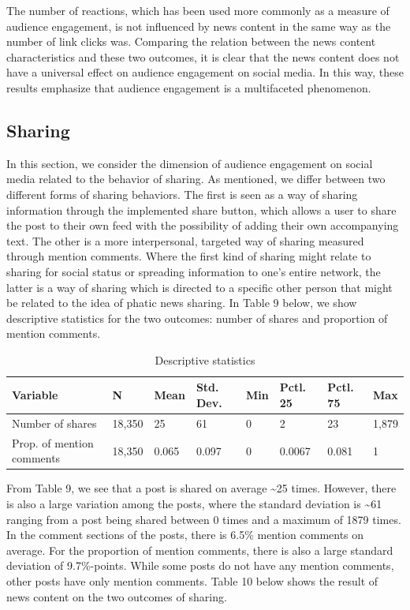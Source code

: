 \documentclass[
]{article}
\begin{document}
The number of reactions, which has been used more commonly as a measure
of audience engagement, is not influenced by news content in the same
way as the number of link clicks was. Comparing the relation between the
news content characteristics and these two outcomes, it is clear that
the news content does not have a universal effect on audience engagement
on social media. In this way, these results emphasize that audience
engagement is a multifaceted phenomenon.

\hypertarget{sharing-1}{%
\subsection{Sharing}\label{sharing-1}}

In this section, we consider the dimension of audience engagement on
social media related to the behavior of sharing. As mentioned, we differ
between two different forms of sharing behaviors. The first is seen as a
way of sharing information through the implemented share button, which
allows a user to share the post to their own feed with the possibility
of adding their own accompanying text. The other is a more
interpersonal, targeted way of sharing measured through mention
comments. Where the first kind of sharing might relate to sharing for
social status or spreading information to one's entire network, the
latter is a way of sharing which is directed to a specific other person
that might be related to the idea of phatic news sharing. In Table 9
below, we show descriptive statistics for the two outcomes: number of
shares and proportion of mention comments.

\begin{table}[H]

\caption{\label{tab:share_describe}Descriptive statistics}
\centering
\begin{tabular}[t]{llllllll}
\toprule
Variable & N & Mean & Std. Dev. & Min & Pctl. 25 & Pctl. 75 & Max\\
\midrule
Number of shares & 18,350 & 25 & 61 & 0 & 2 & 23 & 1,879\\
Prop. of mention comments & 18,350 & 0.065 & 0.097 & 0 & 0.0067 & 0.081 & 1\\
\bottomrule
\end{tabular}
\end{table}

\noindent From Table 9, we see that a post is shared on average
\textasciitilde25 times. However, there is also a large variation among
the posts, where the standard deviation is \textasciitilde61 ranging
from a post being shared between 0 times and a maximum of 1879 times. In
the comment sections of the posts, there is 6.5\% mention comments on
average. For the proportion of mention comments, there is also a large
standard deviation of 9.7\%-points. While some posts do not have any
mention comments, other posts have only mention comments. Table 10 below
shows the result of news content on the two outcomes of sharing.
\end{document}
